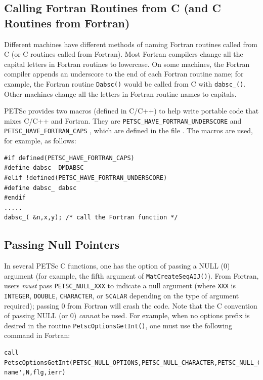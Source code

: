 \subsection{Calling Fortran Routines from C (and C Routines from Fortran)}


Different machines have
different methods of naming Fortran routines called from C
(or C routines called from Fortran). Most Fortran compilers change
all the capital letters in Fortran routines to lowercase. On some machines, the
Fortran compiler appends an underscore to the end of each Fortran
routine name; for example, the Fortran routine \lstinline{Dabsc()}
would be called from C with \lstinline{dabsc_()}.  Other machines
change all the letters in Fortran routine names to capitals.

PETSc provides two macros (defined in C/C++) to help write
portable code that mixes C/C++ and Fortran. They are
\lstinline{PETSC_HAVE_FORTRAN_UNDERSCORE} and \lstinline{PETSC_HAVE_FORTRAN_CAPS}
 ,
which are defined in the file .
The macros are used, for example, as follows:
\begin{lstlisting}
#if defined(PETSC_HAVE_FORTRAN_CAPS)
#define dabsc_ DMDABSC
#elif !defined(PETSC_HAVE_FORTRAN_UNDERSCORE)
#define dabsc_ dabsc
#endif
.....
dabsc_( &n,x,y); /* call the Fortran function */
\end{lstlisting}


\subsection{Passing Null Pointers}

In several PETSc C functions, one has the option of passing a NULL (0)
argument (for example, the fifth argument of \lstinline{MatCreateSeqAIJ()}).
From Fortran, users {\em must} pass \lstinline{PETSC_NULL_XXX} to indicate a
null argument (where \lstinline{XXX} is \lstinline{INTEGER}, \lstinline{DOUBLE}, \lstinline{CHARACTER},
or \lstinline{SCALAR} depending on the type of argument required);
 passing  0 from
 Fortran   will crash
the code.   Note
that the C convention of passing NULL (or 0) {\em cannot}
be used.  For example, when no options prefix is desired in the
routine \lstinline{PetscOptionsGetInt()}, one must use the following command in
Fortran:
\begin{lstlisting}[breakatwhitespace=false]
call PetscOptionsGetInt(PETSC_NULL_OPTIONS,PETSC_NULL_CHARACTER,PETSC_NULL_CHARACTER,'-name',N,flg,ierr)
\end{lstlisting}

